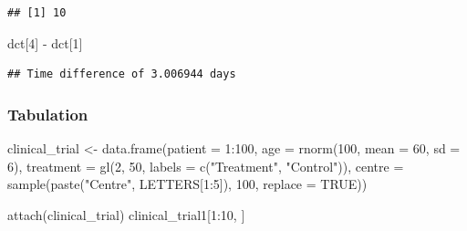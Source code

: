 \documentclass[]{article}
\newenvironment{Shaded}{\begin{snugshade}}{\end{snugshade}}
\newcommand{\AttributeTok}[1]{\textcolor[rgb]{0.77,0.63,0.00}{#1}}
\newcommand{\ConstantTok}[1]{\textcolor[rgb]{0.00,0.00,0.00}{#1}}
\newcommand{\DecValTok}[1]{\textcolor[rgb]{0.00,0.00,0.81}{#1}}
\newcommand{\FunctionTok}[1]{\textcolor[rgb]{0.00,0.00,0.00}{#1}}
\newcommand{\NormalTok}[1]{#1}
\newcommand{\OtherTok}[1]{\textcolor[rgb]{0.56,0.35,0.01}{#1}}
\newcommand{\SpecialCharTok}[1]{\textcolor[rgb]{0.00,0.00,0.00}{#1}}
\newcommand{\StringTok}[1]{\textcolor[rgb]{0.31,0.60,0.02}{#1}}
\begin{document}
\begin{Shaded}
\end{Shaded}

\begin{verbatim}
## [1] 10
\end{verbatim}

\begin{Shaded}
\begin{Highlighting}[]
\NormalTok{dct[}\DecValTok{4}\NormalTok{] }\SpecialCharTok{{-}}\NormalTok{ dct[}\DecValTok{1}\NormalTok{]}
\end{Highlighting}
\end{Shaded}

\begin{verbatim}
## Time difference of 3.006944 days
\end{verbatim}

\hypertarget{tabulation}{%
\subsubsection{Tabulation}\label{tabulation}}

\begin{Shaded}
\begin{Highlighting}[]
\NormalTok{clinical\_trial }\OtherTok{\textless{}{-}}
    \FunctionTok{data.frame}\NormalTok{(}\AttributeTok{patient =} \DecValTok{1}\SpecialCharTok{:}\DecValTok{100}\NormalTok{,}
               \AttributeTok{age =} \FunctionTok{rnorm}\NormalTok{(}\DecValTok{100}\NormalTok{, }\AttributeTok{mean =} \DecValTok{60}\NormalTok{, }\AttributeTok{sd =} \DecValTok{6}\NormalTok{),}
               \AttributeTok{treatment =} \FunctionTok{gl}\NormalTok{(}\DecValTok{2}\NormalTok{, }\DecValTok{50}\NormalTok{,}
                 \AttributeTok{labels =} \FunctionTok{c}\NormalTok{(}\StringTok{"Treatment"}\NormalTok{, }\StringTok{"Control"}\NormalTok{)),}
               \AttributeTok{centre =} \FunctionTok{sample}\NormalTok{(}\FunctionTok{paste}\NormalTok{(}\StringTok{"Centre"}\NormalTok{, LETTERS[}\DecValTok{1}\SpecialCharTok{:}\DecValTok{5}\NormalTok{]),}
                 \DecValTok{100}\NormalTok{, }\AttributeTok{replace =} \ConstantTok{TRUE}\NormalTok{))}

\FunctionTok{attach}\NormalTok{(clinical\_trial)}
\NormalTok{clinical\_trial1[}\DecValTok{1}\SpecialCharTok{:}\DecValTok{10}\NormalTok{, ]}
\end{Highlighting}
\end{Shaded}
\end{document}
